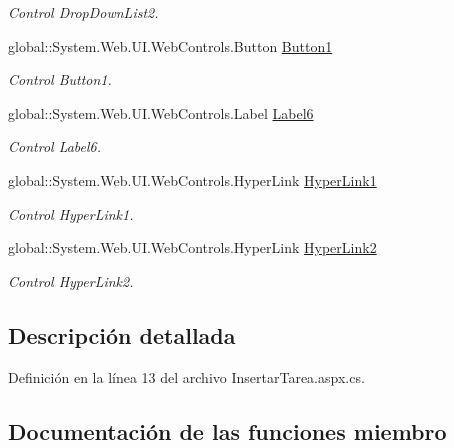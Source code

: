 \begin{DoxyCompactItemize}
\begin{DoxyCompactList}\small\item\em Control Drop\+Down\+List2. \end{DoxyCompactList}\item 
global\+::\+System.\+Web.\+U\+I.\+Web\+Controls.\+Button \mbox{\hyperlink{classInicio_1_1Profesor_1_1InsertarTarea_a1ff0562091d5590d124db0926456c867}{Button1}}
\begin{DoxyCompactList}\small\item\em Control Button1. \end{DoxyCompactList}\item 
global\+::\+System.\+Web.\+U\+I.\+Web\+Controls.\+Label \mbox{\hyperlink{classInicio_1_1Profesor_1_1InsertarTarea_abb5f51dcdce0e6c834e27f2efdaa635e}{Label6}}
\begin{DoxyCompactList}\small\item\em Control Label6. \end{DoxyCompactList}\item 
global\+::\+System.\+Web.\+U\+I.\+Web\+Controls.\+Hyper\+Link \mbox{\hyperlink{classInicio_1_1Profesor_1_1InsertarTarea_a9fcee3b5754dbdeb1c274af936db3c13}{Hyper\+Link1}}
\begin{DoxyCompactList}\small\item\em Control Hyper\+Link1. \end{DoxyCompactList}\item 
global\+::\+System.\+Web.\+U\+I.\+Web\+Controls.\+Hyper\+Link \mbox{\hyperlink{classInicio_1_1Profesor_1_1InsertarTarea_a78889f34c68a38f5de7209c6377b5772}{Hyper\+Link2}}
\begin{DoxyCompactList}\small\item\em Control Hyper\+Link2. \end{DoxyCompactList}\end{DoxyCompactItemize}


\subsection{Descripción detallada}


Definición en la línea 13 del archivo Insertar\+Tarea.\+aspx.\+cs.



\subsection{Documentación de las funciones miembro}
\mbox{\label{classInicio_1_1Profesor_1_1InsertarTarea_a1eea942857a082136fc980b5540c0edc}} 
